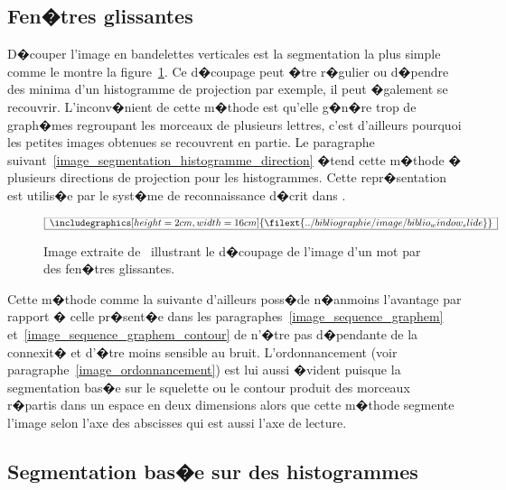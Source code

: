 \subsection{Fen�tres glissantes}
\label{image_fenetre_glissante}

D�couper l'image en bandelettes verticales est la segmentation la plus simple comme le montre la figure~\ref{image_window_slide}. Ce d�coupage peut �tre r�gulier ou d�pendre des minima d'un histogramme de projection par exemple, il peut �galement se recouvrir. L'inconv�nient de cette m�thode est qu'elle g�n�re trop de graph�mes regroupant les morceaux de plusieurs lettres, c'est d'ailleurs pourquoi les petites images obtenues se recouvrent en partie. Le paragraphe suivant~\ref{image_segmentation_histogramme_direction} �tend cette m�thode � plusieurs directions de projection pour les histogrammes. Cette repr�sentation est utilis�e par le syst�me de reconnaissance d�crit dans .


    \begin{figure}[t]
    $$\frame{$\begin{array}[c]{c}\includegraphics[height=2cm, width=16cm]
     {\filext{../bibliographie/image/biblio_window_slide}}\end{array}$}$$
    \caption{    Image extraite de~ illustrant le d�coupage de l'image d'un mot 
                        par des fen�tres glissantes.}
    \label{image_window_slide}
    \end{figure}

Cette m�thode comme la suivante d'ailleurs poss�de n�anmoins l'avantage par rapport � celle pr�sent�e dans les paragraphes~\ref{image_sequence_graphem} et~\ref{image_sequence_graphem_contour} de n'�tre pas d�pendante de la connexit� et d'�tre moins sensible au bruit. L'ordonnancement (voir paragraphe~\ref{image_ordonnancement}) est lui aussi �vident puisque la segmentation bas�e sur le squelette ou le contour produit des morceaux r�partis dans un espace en deux dimensions alors que cette m�thode segmente l'image selon l'axe des abscisses qui est aussi l'axe de lecture.







\subsection{Segmentation bas�e sur des histogrammes}
\label{image_segmentation_histogramme_direction}


